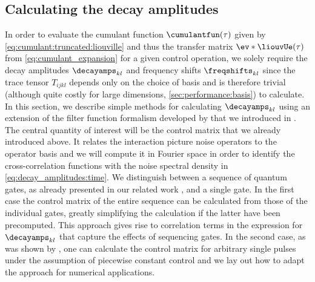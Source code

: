
\subsection{Calculating the decay amplitudes}\label{sec:theory:decay_amplitudes}
In order to evaluate the cumulant function $\cumulantfun(\tau)$ given by \cref{eq:cumulant:truncated:liouville} and thus the transfer matrix $\ev*{\liouvUe(\tau)}$ from \cref{eq:cumulant_expansion} for a given control operation, we solely require the decay amplitudes $\decayamps_{kl}$ and frequency shifts $\freqshifts_{kl}$ since the trace tensor $T_{ijkl}$ depends only on the choice of basis and is therefore trivial (although quite costly for large dimensions, \cf \cref{sec:performance:basis}) to calculate. In this section, we describe simple methods for calculating $\decayamps_{kl}$ using an extension of the filter function formalism developed by \citeauthor{Green2013} that we introduced in . The central quantity of interest will be the control matrix that we already introduced above. It relates the interaction picture noise operators to the operator basis and we will compute it in Fourier space in order to identify the cross-correlation functions with the noise spectral density in \cref{eq:decay_amplitudes:time}. We distinguish between a sequence of quantum gates, as already presented in our related work \cite{Cerfontaine2021}, and a single gate. In the first case the control matrix of the entire sequence can be calculated from those of the individual gates, greatly simplifying the calculation if the latter have been precomputed. This approach gives rise to correlation terms in the expression for $\decayamps_{kl}$ that capture the effects of sequencing gates. In the second case, as was shown by \citeauthor{Green2013}, one can calculate the control matrix for arbitrary single pulses under the assumption of piecewise constant control and we lay out how to adapt the approach for numerical applications.

